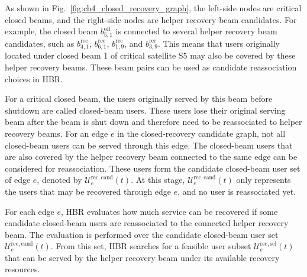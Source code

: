 As shown in Fig.~\ref{fig:ch4_closed_recovery_graph}, the left-side nodes are critical closed beams, and the right-side nodes are helper recovery beam candidates. For example, the closed beam $b_{5,1}^{\mathrm{off}}$ is connected to several helper recovery beam candidates, such as $b_{4,1}^{\mathrm{rec}}$, $b_{6,1}^{\mathrm{rec}}$, $b_{1,9}^{\mathrm{rec}}$, and $b_{3,9}^{\mathrm{rec}}$. This means that users originally located under closed beam 1 of critical satellite S5 may also be covered by these helper recovery beams. These beam pairs can be used as candidate reassociation choices in HBR.

\setcounter{subsubsection}{0}
For a critical closed beam, the users originally served by this beam before shutdown are called closed-beam users. These users lose their original serving beam after the beam is shut down and therefore need to be reassociated to helper recovery beams. For an edge $e$ in the closed-recovery candidate graph, not all closed-beam users can be served through this edge. The closed-beam users that are also covered by the helper recovery beam connected to the same edge can be considered for reassociation. These users form the candidate closed-beam user set of edge $e$, denoted by $\mathcal{U}_e^{\mathrm{rec,cand}}(t)$. At this stage, $\mathcal{U}_e^{\mathrm{rec,cand}}(t)$ only represents the users that may be recovered through edge $e$, and no user is reassociated yet.

For each edge $e$, HBR evaluates how much service can be recovered if some candidate closed-beam users are reassociated to the connected helper recovery beam. The evaluation is performed over the candidate closed-beam user set $\mathcal{U}_e^{\mathrm{rec,cand}}(t)$. From this set, HBR searches for a feasible user subset $\mathcal{U}_e^{\mathrm{rec,sel}}(t)$ that can be served by the helper recovery beam under its available recovery resources.

